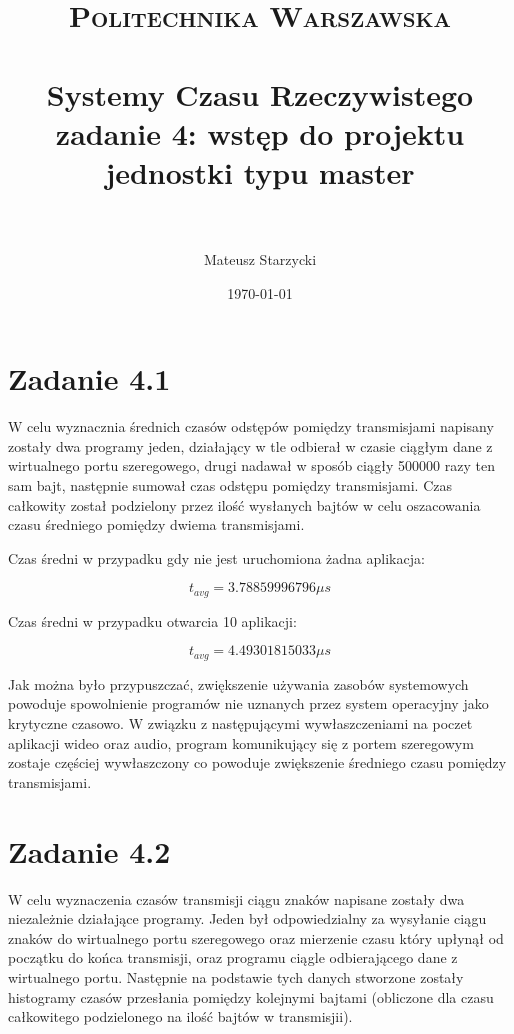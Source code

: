 \documentclass[paper=a4, fontsize=11pt]{scrartcl} %
\title{ 
    \normalfont \normalsize 
    \textsc{Politechnika Warszawska} \\ [25pt] %
    \horrule{0.5pt} \\[0.4cm] %
    \huge Systemy Czasu Rzeczywistego zadanie 4: wstęp do projektu jednostki typu master\\ %
    \horrule{2pt} \\[0.5cm] %
}
\author{Mateusz Starzycki} %
\date{\normalsize\today} %
\numberwithin{equation}{section} %
\numberwithin{figure}{section} %
\numberwithin{table}{section} %
\begin{document}
\maketitle %


\newpage

\section{Zadanie 4.1}

W celu wyznacznia średnich czasów odstępów pomiędzy transmisjami napisany zostały dwa programy
jeden, działający w tle odbierał w czasie ciągłym dane z wirtualnego portu szeregowego, drugi
nadawał w sposób ciągły 500000 razy ten sam bajt, następnie sumował czas odstępu pomiędzy transmisjami.
Czas całkowity został podzielony przez
ilość wysłanych bajtów w celu oszacowania czasu średniego pomiędzy dwiema transmisjami.

Czas średni w przypadku gdy nie jest uruchomiona żadna aplikacja:

\[t_{avg}=3.78859996796\mu s\]

Czas średni w przypadku otwarcia 10 aplikacji:

\[t_{avg}=4.49301815033\mu s\]

Jak można było przypuszczać, zwiększenie używania zasobów systemowych powoduje spowolnienie programów
nie uznanych przez system operacyjny jako krytyczne czasowo. W związku z następującymi wywłaszczeniami 
na poczet aplikacji wideo oraz audio, program komunikujący się z portem szeregowym zostaje częściej wywłaszczony
co powoduje zwiększenie średniego czasu pomiędzy transmisjami.

\section{Zadanie 4.2}

W celu wyznaczenia czasów transmisji ciągu znaków napisane zostały dwa niezależnie działające programy.
Jeden był odpowiedzialny za wysyłanie ciągu znaków do wirtualnego portu szeregowego oraz mierzenie czasu który
upłynął od początku do końca transmisji, oraz programu ciągle odbierającego dane z wirtualnego portu.
Następnie na podstawie tych danych stworzone zostały 
histogramy czasów przesłania pomiędzy kolejnymi bajtami (obliczone dla czasu całkowitego podzielonego
na ilość bajtów w transmisjii).
\end{document}
